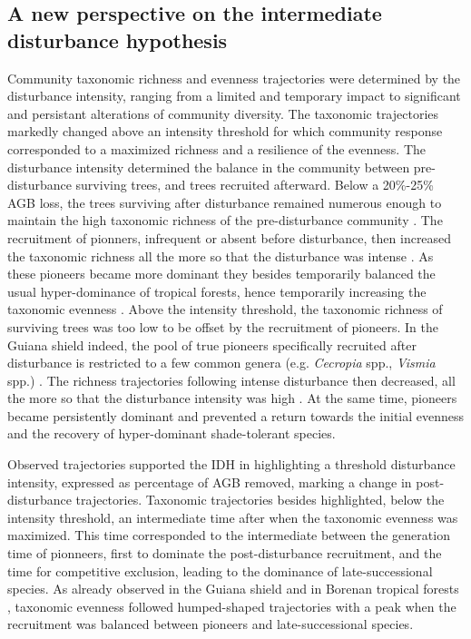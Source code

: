\documentclass[fleqn,10pt]{ArtEcoFoG} %
\begin{document}
\subsection{A new perspective on the intermediate disturbance
hypothesis}\label{a-new-perspective-on-the-intermediate-disturbance-hypothesis}

Community taxonomic richness and evenness trajectories were determined
by the disturbance intensity, ranging from a limited and temporary
impact to significant and persistant alterations of community diversity.
The taxonomic trajectories markedly changed above an intensity threshold
for which community response corresponded to a maximized richness and a
resilience of the evenness. The disturbance intensity determined the
balance in the community between pre-disturbance surviving trees, and
trees recruited afterward. Below a 20\%-25\% AGB loss, the trees
surviving after disturbance remained numerous enough to maintain the
high taxonomic richness of the pre-disturbance community
\citep{Bongers2009}. The recruitment of pionners, infrequent or absent
before disturbance, then increased the taxonomic richness all the more
so that the disturbance was intense \citep{Martin2015, Chaudhary2016}.
As these pioneers became more dominant they besides temporarily balanced
the usual hyper-dominance of tropical forests, hence temporarily
increasing the taxonomic evenness \citep{Baraloto2012a}. Above the
intensity threshold, the taxonomic richness of surviving trees was too
low to be offset by the recruitment of pioneers. In the Guiana shield
indeed, the pool of true pioneers specifically recruited after
disturbance is restricted to a few common genera (e.g. \emph{Cecropia}
spp., \emph{Vismia} spp.) \citep{Guitet2018}. The richness trajectories
following intense disturbance then decreased, all the more so that the
disturbance intensity was high \citep{Molino2001}. At the same time,
pioneers became persistently dominant and prevented a return towards the
initial evenness and the recovery of hyper-dominant shade-tolerant
species.

Observed trajectories supported the IDH in highlighting a threshold
disturbance intensity, expressed as percentage of AGB removed, marking a
change in post-disturbance trajectories. Taxonomic trajectories besides
highlighted, below the intensity threshold, an intermediate time after
when the taxonomic evenness was maximized. This time corresponded to the
intermediate between the generation time of pionneers, first to dominate
the post-disturbance recruitment, and the time for competitive
exclusion, leading to the dominance of late-successional species. As
already observed in the Guiana shield \citep{Baraloto2012a} and in
Borenan tropical forests \citep{Cannon1998}, taxonomic evenness followed
humped-shaped trajectories with a peak when the recruitment was balanced
between pioneers and late-successional species.
\end{document}
